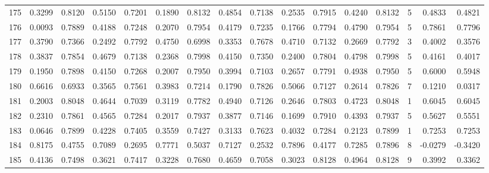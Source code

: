 \begin{tabular}{lrrrrrrrrrrrrrrr}
175 &      0.3299 &  0.8120 &  0.5150 &  0.7201 &  0.1890 &  0.8132 &  0.4854 &  0.7138 &  0.2535 &  0.7915 &   0.4240 &     0.8132 &      5 &                    0.4833 &                     0.4821 \\
176 &      0.0093 &  0.7889 &  0.4188 &  0.7248 &  0.2070 &  0.7954 &  0.4179 &  0.7235 &  0.1766 &  0.7794 &   0.4790 &     0.7954 &      5 &                    0.7861 &                     0.7796 \\
177 &      0.3790 &  0.7366 &  0.2492 &  0.7792 &  0.4750 &  0.6998 &  0.3353 &  0.7678 &  0.4710 &  0.7132 &   0.2669 &     0.7792 &      3 &                    0.4002 &                     0.3576 \\
178 &      0.3837 &  0.7854 &  0.4679 &  0.7138 &  0.2368 &  0.7998 &  0.4150 &  0.7350 &  0.2400 &  0.7804 &   0.4798 &     0.7998 &      5 &                    0.4161 &                     0.4017 \\
179 &      0.1950 &  0.7898 &  0.4150 &  0.7268 &  0.2007 &  0.7950 &  0.3994 &  0.7103 &  0.2657 &  0.7791 &   0.4938 &     0.7950 &      5 &                    0.6000 &                     0.5948 \\
180 &      0.6616 &  0.6933 &  0.3565 &  0.7561 &  0.3983 &  0.7214 &  0.1790 &  0.7826 &  0.5066 &  0.7127 &   0.2614 &     0.7826 &      7 &                    0.1210 &                     0.0317 \\
181 &      0.2003 &  0.8048 &  0.4644 &  0.7039 &  0.3119 &  0.7782 &  0.4940 &  0.7126 &  0.2646 &  0.7803 &   0.4723 &     0.8048 &      1 &                    0.6045 &                     0.6045 \\
182 &      0.2310 &  0.7861 &  0.4565 &  0.7284 &  0.2017 &  0.7937 &  0.3877 &  0.7146 &  0.1699 &  0.7910 &   0.4393 &     0.7937 &      5 &                    0.5627 &                     0.5551 \\
183 &      0.0646 &  0.7899 &  0.4228 &  0.7405 &  0.3559 &  0.7427 &  0.3133 &  0.7623 &  0.4032 &  0.7284 &   0.2123 &     0.7899 &      1 &                    0.7253 &                     0.7253 \\
184 &      0.8175 &  0.4755 &  0.7089 &  0.2695 &  0.7771 &  0.5037 &  0.7127 &  0.2532 &  0.7896 &  0.4177 &   0.7285 &     0.7896 &      8 &                   -0.0279 &                    -0.3420 \\
185 &      0.4136 &  0.7498 &  0.3621 &  0.7417 &  0.3228 &  0.7680 &  0.4659 &  0.7058 &  0.3023 &  0.8128 &   0.4964 &     0.8128 &      9 &                    0.3992 &                     0.3362 \\

\end{tabular}

